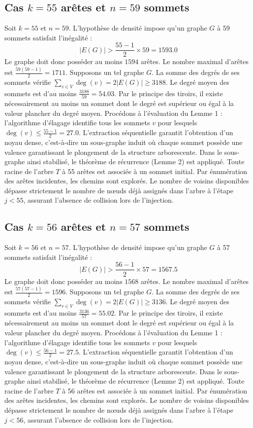 \documentclass[12pt,a4paper]{article}
\begin{document}
\subsection{Cas $k = 55$ arêtes et $n = 59$ sommets}
Soit $k = 55$ et $n = 59$. L'hypothèse de densité impose qu'un graphe $G$ à 59 sommets satisfait l'inégalité :
$$ |E(G)| > \frac{55-1}{2} \times 59 = 1593.0 $$
Le graphe doit donc posséder au moins $1594$ arêtes. Le nombre maximal d'arêtes est $\frac{59(59-1)}{2} = 1711$.
Supposons un tel graphe $G$. La somme des degrés de ses sommets vérifie $\sum_{v \in V} \deg(v) = 2|E(G)| \geq 3188$.
Le degré moyen des sommets est d'au moins $\frac{3188}{59} = 54.03$.
Par le principe des tiroirs, il existe nécessairement au moins un sommet dont le degré est supérieur ou égal à la valeur plancher du degré moyen.
Procédons à l'évaluation du Lemme 1 : l'algorithme d'élagage identifie tous les sommets $v$ pour lesquels $\deg(v) \leq \frac{55-1}{2} = 27.0$.
L'extraction séquentielle garantit l'obtention d'un noyau dense, c'est-à-dire un sous-graphe induit où chaque sommet possède une valence garantissant le plongement de la structure arborescente.
Dans le sous-graphe ainsi stabilisé, le théorème de récurrence (Lemme 2) est appliqué. Toute racine de l'arbre $T$ à 55 arêtes est associée à un sommet initial. Par énumération des arêtes incidentes, les chemins sont explorés. Le nombre de voisins disponibles dépasse strictement le nombre de nœuds déjà assignés dans l'arbre à l'étape $j < 55$, assurant l'absence de collision lors de l'injection.

\subsection{Cas $k = 56$ arêtes et $n = 57$ sommets}
Soit $k = 56$ et $n = 57$. L'hypothèse de densité impose qu'un graphe $G$ à 57 sommets satisfait l'inégalité :
$$ |E(G)| > \frac{56-1}{2} \times 57 = 1567.5 $$
Le graphe doit donc posséder au moins $1568$ arêtes. Le nombre maximal d'arêtes est $\frac{57(57-1)}{2} = 1596$.
Supposons un tel graphe $G$. La somme des degrés de ses sommets vérifie $\sum_{v \in V} \deg(v) = 2|E(G)| \geq 3136$.
Le degré moyen des sommets est d'au moins $\frac{3136}{57} = 55.02$.
Par le principe des tiroirs, il existe nécessairement au moins un sommet dont le degré est supérieur ou égal à la valeur plancher du degré moyen.
Procédons à l'évaluation du Lemme 1 : l'algorithme d'élagage identifie tous les sommets $v$ pour lesquels $\deg(v) \leq \frac{56-1}{2} = 27.5$.
L'extraction séquentielle garantit l'obtention d'un noyau dense, c'est-à-dire un sous-graphe induit où chaque sommet possède une valence garantissant le plongement de la structure arborescente.
Dans le sous-graphe ainsi stabilisé, le théorème de récurrence (Lemme 2) est appliqué. Toute racine de l'arbre $T$ à 56 arêtes est associée à un sommet initial. Par énumération des arêtes incidentes, les chemins sont explorés. Le nombre de voisins disponibles dépasse strictement le nombre de nœuds déjà assignés dans l'arbre à l'étape $j < 56$, assurant l'absence de collision lors de l'injection.
\end{document}
